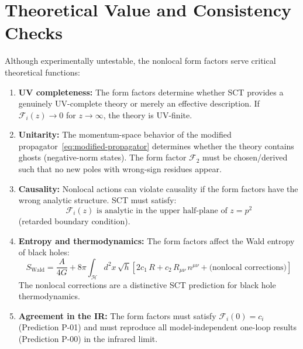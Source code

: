 \documentclass[11pt,a4paper]{article}
\begin{document}
\section{Theoretical Value and Consistency Checks}

Although experimentally untestable, the nonlocal form factors serve critical theoretical functions:

\begin{enumerate}
  \item \textbf{UV completeness:} The form factors determine whether SCT provides a genuinely UV-complete theory or merely an effective description. If $\mathcal{F}_i(z) \to 0$ for $z \to \infty$, the theory is UV-finite.

  \item \textbf{Unitarity:} The momentum-space behavior of the modified propagator~\eqref{eq:modified-propagator} determines whether the theory contains ghosts (negative-norm states). The form factor $\mathcal{F}_2$ must be chosen/derived such that no new poles with wrong-sign residues appear.

  \item \textbf{Causality:} Nonlocal actions can violate causality if the form factors have the wrong analytic structure. SCT must satisfy:
    \begin{equation}
      \mathcal{F}_i(z) \text{ is analytic in the upper half-plane of $z = p^2$}
    \end{equation}
    (retarded boundary condition).

  \item \textbf{Entropy and thermodynamics:} The form factors affect the Wald entropy of black holes:
    \begin{equation}
      S_{\text{Wald}} = \frac{A}{4G} + 8\pi\int_{\mathcal{H}} d^2x\,\sqrt{h}\left[
        2c_1\,R + c_2\,R_{\mu\nu}\,n^{\mu\nu}
        + \text{(nonlocal corrections)}
      \right]
    \end{equation}
    The nonlocal corrections are a distinctive SCT prediction for black hole thermodynamics.

  \item \textbf{Agreement in the IR:} The form factors must satisfy $\mathcal{F}_i(0) = c_i$ (Prediction P-01) and must reproduce all model-independent one-loop results (Prediction P-00) in the infrared limit.
\end{enumerate}
\end{document}

